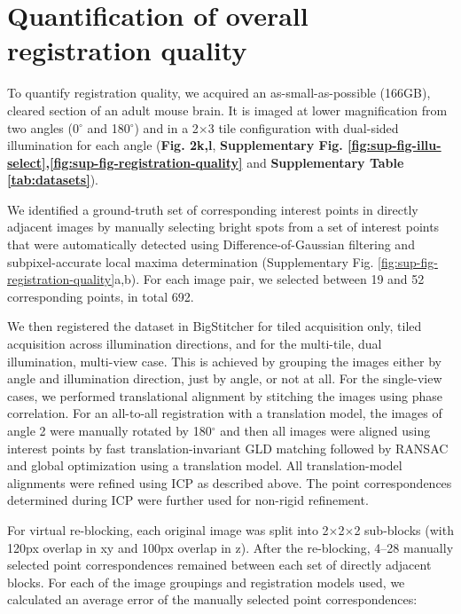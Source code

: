 \section{Quantification of overall registration quality}
\label{sec:quantReg}

To quantify registration quality, we acquired an as-small-as-possible (166GB), cleared section of an adult mouse brain. It is imaged at lower magnification from two angles (0${}^\circ$ and 180${}^\circ$) and in a 2$\times$3 tile configuration with dual-sided illumination for each angle (\textbf{Fig. 2k,l}, \textbf{Supplementary Fig. \ref{fig:sup-fig-illu-select},\ref{fig:sup-fig-registration-quality}} and \textbf{Supplementary Table \ref{tab:datasets}}).

We identified a ground-truth set of corresponding interest points in directly adjacent images by manually selecting bright spots from a set of interest points that were automatically detected using Difference-of-Gaussian filtering and subpixel-accurate local maxima determination (Supplementary Fig. \ref{fig:sup-fig-registration-quality}a,b). For each image pair, we selected between 19 and 52 corresponding points, in total 692.

We then registered the dataset in BigStitcher for tiled acquisition only, tiled acquisition across illumination directions, and for the multi-tile, dual illumination, multi-view case. This is achieved by grouping the images either by angle and illumination direction, just by angle, or not at all. 
For the single-view cases, we performed translational alignment by stitching the images using phase correlation. For an all-to-all registration with a translation model, the images of angle 2 were manually rotated by 180${}^\circ$ and then all images were aligned using interest points by fast translation-invariant GLD matching followed by RANSAC\cite{ransac} and global optimization using a translation model. All translation-model alignments were refined using ICP\cite{icp} as described above. The point correspondences determined during ICP were further used for non-rigid refinement.

For virtual re-blocking, each original image was split into 2$\times$2$\times$2 sub-blocks (with 120px overlap in xy and 100px overlap in z). After the re-blocking, 4--28 manually selected point correspondences remained between each set of directly adjacent blocks. For each of the image groupings and registration models used, we calculated an average error of the manually selected point correspondences:

